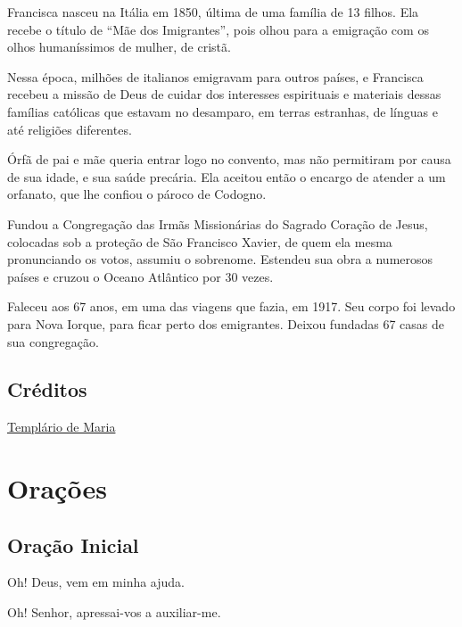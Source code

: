 \documentclass[11pt]{article}
\begin{document}
\begin{justify}

 \hspace{.5cm}Francisca nasceu na Itália em 1850, última de uma família de 13 filhos. Ela recebe o título de “Mãe dos Imigrantes”, pois olhou para a emigração com os olhos humaníssimos de mulher, de cristã.

Nessa época, milhões de italianos emigravam para outros países, e Francisca recebeu a missão de Deus de cuidar dos interesses espirituais e materiais dessas famílias católicas que estavam no desamparo, em terras estranhas, de línguas e até religiões diferentes.

Órfã de pai e mãe queria entrar logo no convento, mas não permitiram por causa de sua idade, e sua saúde precária. Ela aceitou então o encargo de atender a um orfanato, que lhe confiou o pároco de Codogno.

Fundou a Congregação das Irmãs Missionárias do Sagrado Coração de Jesus, colocadas sob a proteção de São Francisco Xavier, de quem ela mesma pronunciando os votos, assumiu o sobrenome. Estendeu sua obra a numerosos países e cruzou o Oceano Atlântico por 30 vezes.

Faleceu aos 67 anos, em uma das viagens que fazia, em 1917. Seu corpo foi levado para Nova Iorque, para ficar perto dos emigrantes. Deixou fundadas 67 casas de sua congregação.

\end{justify}

\subsection*{Créditos }
\href{https://templariodemaria.com/santo-do-dia-22-de-dezembro-santa-francisca-xavier-cabrini/}{Templário de Maria}

\newpage


\section{Orações}\label{oracoes}

\subsection{Oração Inicial}
Oh! Deus, vem em minha ajuda.

Oh! Senhor, apressai-vos a auxiliar-me.
\end{document}

